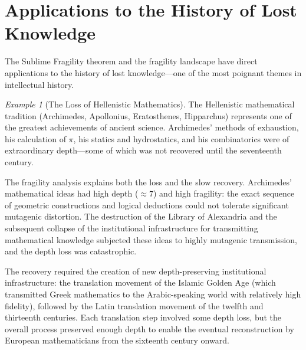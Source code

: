 \documentclass[11pt,openany]{book}
\theoremstyle{definition}
\theoremstyle{plain}
\theoremstyle{remark}
\newtheorem{example}[axiom]{Example}
\begin{document}
\section{Applications to the History of Lost Knowledge}

The Sublime Fragility theorem and the fragility landscape have direct applications to the history of lost knowledge---one of the most poignant themes in intellectual history.

\begin{example}[The Loss of Hellenistic Mathematics]
The Hellenistic mathematical tradition (Archimedes, Apollonius, Eratosthenes, Hipparchus) represents one of the greatest achievements of ancient science. Archimedes' methods of exhaustion, his calculation of $\pi$, his statics and hydrostatics, and his combinatorics were of extraordinary depth---some of which was not recovered until the seventeenth century.

The fragility analysis explains both the loss and the slow recovery. Archimedes' mathematical ideas had high depth ($\approx 7$) and high fragility: the exact sequence of geometric constructions and logical deductions could not tolerate significant mutagenic distortion. The destruction of the Library of Alexandria and the subsequent collapse of the institutional infrastructure for transmitting mathematical knowledge subjected these ideas to highly mutagenic transmission, and the depth loss was catastrophic.

The recovery required the creation of new depth-preserving institutional infrastructure: the translation movement of the Islamic Golden Age (which transmitted Greek mathematics to the Arabic-speaking world with relatively high fidelity), followed by the Latin translation movement of the twelfth and thirteenth centuries. Each translation step involved some depth loss, but the overall process preserved enough depth to enable the eventual reconstruction by European mathematicians from the sixteenth century onward.
\end{example}
\end{document}
